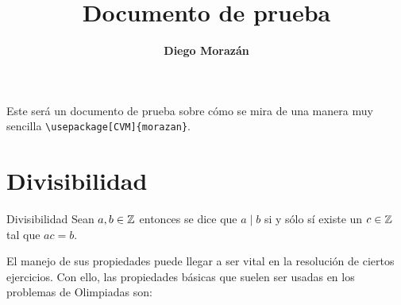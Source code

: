 \documentclass[letterpaper, 13pt]{article}
\title{\bfseries \huge Documento de prueba}
\author{\bfseries \Large Diego Morazán}
\begin{document}
\maketitle

Este será un documento de prueba sobre cómo se mira de una manera muy sencilla \texttt{\textbackslash usepackage[CVM]\{morazan\}}.

\section{Divisibilidad}
\begin{definicion}{Divisibilidad}{}
	Sean $a,b \in \mathbb{Z}$ entonces se dice que $a \mid b$ si y sólo sí existe un $c\in\mathbb{Z}$  tal que $ac=b$.
\end{definicion}
El manejo de sus propiedades puede llegar a ser vital en la resolución de ciertos ejercicios. Con ello, las propiedades básicas que suelen ser usadas en los problemas de Olimpiadas son: 
\end{document}
